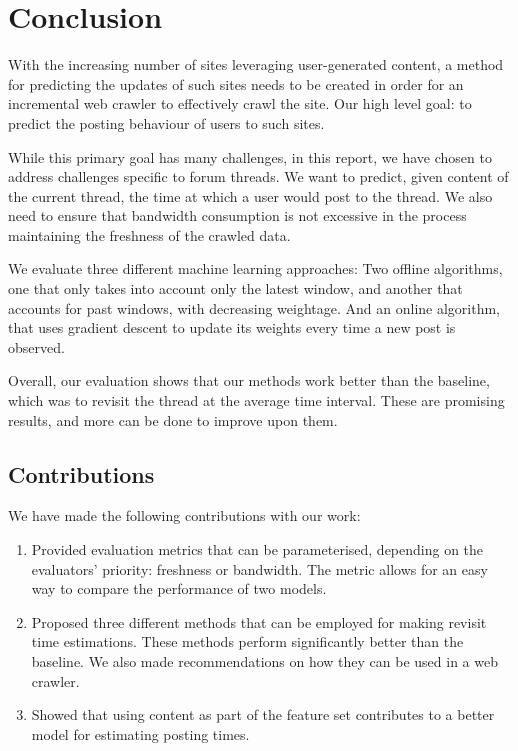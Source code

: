 \chapter{Conclusion}

With the increasing number of sites leveraging user-generated content, a method 
for predicting the updates of such sites needs to be created in order for an 
incremental web crawler to effectively crawl the site. Our high level goal: to 
predict the posting behaviour of users to such sites.

While this primary goal has many challenges, in this report, we have chosen to 
address challenges specific to forum threads. We want to predict, given content 
of the current thread, the time at which a user would post to the thread. We 
also need to ensure that bandwidth consumption is not excessive in the process 
maintaining the freshness of the crawled data.

We evaluate three different machine learning approaches: Two offline algorithms, 
one that only takes into account only the latest window, and another that 
accounts for past windows, with decreasing weightage. And an online algorithm, 
that uses gradient descent to update its weights every time a new post is 
observed.

Overall, our evaluation shows that our methods work better than the baseline, 
which was to revisit the thread at the average time interval. These are 
promising results, and more can be done to improve upon them. 

\section{Contributions}
We have made the following contributions with our work:
\begin{enumerate}
\item Provided evaluation metrics that can be parameterised, depending on the 
	evaluators' priority: freshness or bandwidth. The metric allows for an easy 
	way to compare the performance of two models.

\item Proposed three different methods that can be employed for making revisit 
time estimations. These methods perform significantly better than the baseline.  
We also made recommendations on how they can be used in a web crawler.  

\item Showed that using content as part of the feature set contributes to a 
better model for estimating posting times.
\end{enumerate}

